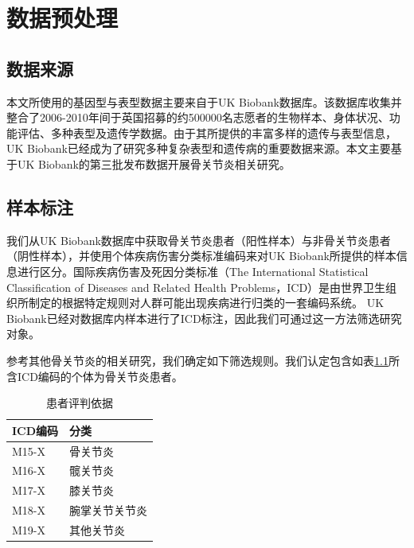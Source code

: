 \chapter{数据预处理}
\section{数据来源}

本文所使用的基因型与表型数据主要来自于UK Biobank\cite{sudlow_uk_2015}数据库。该数据库收集并整合了2006-2010年间于英国招募的约500000名志愿者的生物样本、身体状况、功能评估、多种表型及遗传学数据。由于其所提供的丰富多样的遗传与表型信息，UK Biobank已经成为了研究多种复杂表型和遗传病的重要数据来源。本文主要基于UK Biobank的第三批发布数据开展骨关节炎相关研究。

\section{样本标注}

我们从UK Biobank数据库中获取骨关节炎患者（阳性样本）与非骨关节炎患者（阴性样本），并使用个体疾病伤害分类标准编码来对UK Biobank所提供的样本信息进行区分。国际疾病伤害及死因分类标准（The International Statistical Classification of Diseases and Related Health Problems，ICD）是由世界卫生组织所制定的根据特定规则对人群可能出现疾病进行归类的一套编码系统\cite{who}。 UK Biobank已经对数据库内样本进行了ICD标注，因此我们可通过这一方法筛选研究对象。

参考其他骨关节炎的相关研究\cite{zengini_genome-wide_2018}，我们确定如下筛选规则。我们认定包含如表\ref{ICD_include}所含ICD编码的个体为骨关节炎患者。


\begin{table}[!h]
	\renewcommand{\arraystretch}{1.2}
	\centering\wuhao
	\caption{患者评判依据} \label{ICD_include} \vspace{2mm}
	\begin{tabularx}{\textwidth} { 
   >{\centering\arraybackslash}X 
   >{\centering\arraybackslash}X  }
	\toprule[1.5pt]
		ICD编码 & 分类 \\
	\midrule[1pt]
		M15-X & 骨关节炎 \\
        M16-X & 髋关节炎 \\
        M17-X & 膝关节炎 \\
        M18-X & 腕掌关节关节炎 \\
        M19-X & 其他关节炎 \\
	\bottomrule[1.5pt]
	\end{tabularx}
\end{table}

